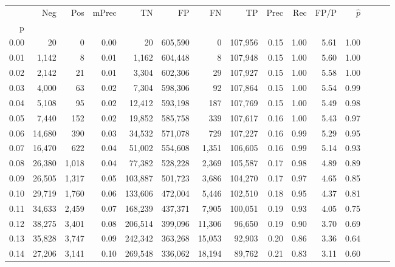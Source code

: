 \begin{tabular}{rrrrrrrrrrrrrrr}
\toprule
{} &     Neg &    Pos & mPrec &       TN &       FP &       FN &       TP &  Prec &   Rec &  FP/P & $\hat{p}$ \\
p    &         &        &       &          &          &          &          &       &       &       &           \\
\midrule
0.00 &      20 &      0 &  0.00 &       20 &  605,590 &        0 &  107,956 &  0.15 &  1.00 &  5.61 &      1.00 \\
0.01 &   1,142 &      8 &  0.01 &    1,162 &  604,448 &        8 &  107,948 &  0.15 &  1.00 &  5.60 &      1.00 \\
0.02 &   2,142 &     21 &  0.01 &    3,304 &  602,306 &       29 &  107,927 &  0.15 &  1.00 &  5.58 &      1.00 \\
0.03 &   4,000 &     63 &  0.02 &    7,304 &  598,306 &       92 &  107,864 &  0.15 &  1.00 &  5.54 &      0.99 \\
0.04 &   5,108 &     95 &  0.02 &   12,412 &  593,198 &      187 &  107,769 &  0.15 &  1.00 &  5.49 &      0.98 \\
0.05 &   7,440 &    152 &  0.02 &   19,852 &  585,758 &      339 &  107,617 &  0.16 &  1.00 &  5.43 &      0.97 \\
0.06 &  14,680 &    390 &  0.03 &   34,532 &  571,078 &      729 &  107,227 &  0.16 &  0.99 &  5.29 &      0.95 \\
0.07 &  16,470 &    622 &  0.04 &   51,002 &  554,608 &    1,351 &  106,605 &  0.16 &  0.99 &  5.14 &      0.93 \\
0.08 &  26,380 &  1,018 &  0.04 &   77,382 &  528,228 &    2,369 &  105,587 &  0.17 &  0.98 &  4.89 &      0.89 \\
0.09 &  26,505 &  1,317 &  0.05 &  103,887 &  501,723 &    3,686 &  104,270 &  0.17 &  0.97 &  4.65 &      0.85 \\
0.10 &  29,719 &  1,760 &  0.06 &  133,606 &  472,004 &    5,446 &  102,510 &  0.18 &  0.95 &  4.37 &      0.81 \\
0.11 &  34,633 &  2,459 &  0.07 &  168,239 &  437,371 &    7,905 &  100,051 &  0.19 &  0.93 &  4.05 &      0.75 \\
0.12 &  38,275 &  3,401 &  0.08 &  206,514 &  399,096 &   11,306 &   96,650 &  0.19 &  0.90 &  3.70 &      0.69 \\
0.13 &  35,828 &  3,747 &  0.09 &  242,342 &  363,268 &   15,053 &   92,903 &  0.20 &  0.86 &  3.36 &      0.64 \\
0.14 &  27,206 &  3,141 &  0.10 &  269,548 &  336,062 &   18,194 &   89,762 &  0.21 &  0.83 &  3.11 &      0.60 \\

\end{tabular}
